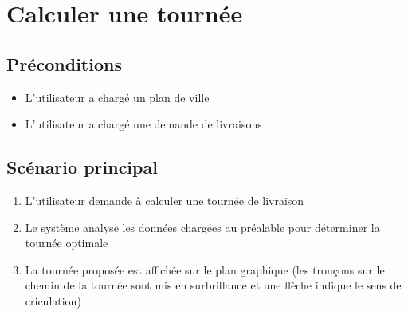 \section{Calculer une tournée}

\subsection{Préconditions}

\begin{itemize}
\item L'utilisateur a chargé un plan de ville
\item L'utilisateur a chargé une demande de livraisons
\end{itemize}

\subsection{Scénario principal}

\begin{enumerate}
\item L'utilisateur demande à calculer une tournée de livraison
\item Le système analyse les données chargées au préalable pour déterminer la tournée optimale
\item La tournée proposée est affichée sur le plan graphique (les tronçons sur le chemin de la tournée sont mis en surbrillance et une flèche indique le sens de criculation)
\end{enumerate}


